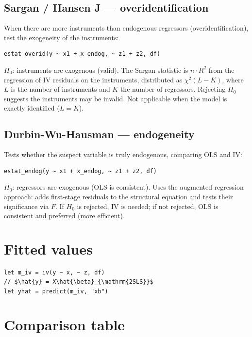 \subsection{Sargan / Hansen J --- overidentification}

When there are more instruments than endogenous regressors
(overidentification), test the exogeneity of the instruments:

\begin{lstlisting}
estat_overid(y ~ x1 + x_endog, ~ z1 + z2, df)
\end{lstlisting}

$H_0$: instruments are exogenous (valid). The Sargan statistic is
$n \cdot R^2$ from the regression of IV residuals on the instruments,
distributed as $\chi^2(L - K)$, where $L$ is the number of instruments
and $K$ the number of regressors. Rejecting $H_0$ suggests the
instruments may be invalid. Not applicable when the model is exactly
identified ($L = K$).

\subsection{Durbin-Wu-Hausman --- endogeneity}

Tests whether the suspect variable is truly endogenous, comparing OLS
and IV:

\begin{lstlisting}
estat_endog(y ~ x1 + x_endog, ~ z1 + z2, df)
\end{lstlisting}

$H_0$: regressors are exogenous (OLS is consistent). Uses the augmented
regression approach: adds first-stage residuals to the structural
equation and tests their significance via $F$. If $H_0$ is rejected, IV
is needed; if not rejected, OLS is consistent and preferred (more
efficient).

\section{Fitted values}

\begin{lstlisting}
let m_iv = iv(y ~ x, ~ z, df)
// $\hat{y} = X\hat{\beta}_{\mathrm{2SLS}}$
let yhat = predict(m_iv, "xb")
\end{lstlisting}

\section{Comparison table}

